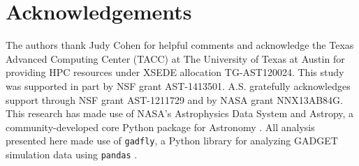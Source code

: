 \section*{Acknowledgements}
The authors thank Judy Cohen for helpful comments and acknowledge the Texas Advanced Computing Center (TACC) at The University of Texas at Austin for providing HPC resources under XSEDE allocation TG-AST120024. This study was supported in part by NSF grant AST-1413501. A.S. gratefully acknowledges support through NSF grant AST-1211729 and by NASA grant NNX13AB84G. This research has made use of NASA's Astrophysics Data System and Astropy, a community-developed core Python package for Astronomy \citep{Robitailleetal2013}. All analysis presented here made use of \verb|gadfly|, a Python library for analyzing GADGET simulation data using \verb|pandas| \citep{Hummel2016}.